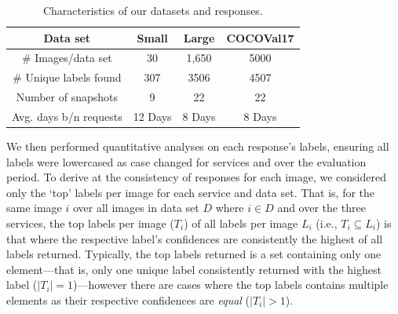 \begin{table}[t]
\caption[Characteristics of data in CV evolution assessment]{Characteristics of our datasets and responses.}
\label{icsme2019:tab:dataset}
\centering
\begin{tabular}{c||c|c|c}
  \toprule
  \textbf{Data set} & \textbf{Small} & \textbf{Large} & \textbf{COCOVal17} \\
  \midrule
  \# Images/data set & 30 & 1,650 & 5000 \\
  \# Unique labels found & 307 & 3506 & 4507\\
  Number of snapshots & 9 & 22 & 22 \\
  Avg. days b/n requests & 12 Days & 8 Days & 8 Days \\
  \bottomrule
\end{tabular}
\end{table}


We then performed quantitative analyses on each response's labels, ensuring all labels were lowercased as case changed for services \googleapi{} and \awsapi{} over the evaluation period. To derive at the consistency of responses for each image, we considered only the `top' labels per image for each service and data set. That is, for the same image $i$ over all images in data set $D$ where $i \in D$ and over the three services, the top labels per image ($T_{i}$) of all labels per image $L_{i}$ (i.e., $T_{i} \subseteq L_{i}$) is that where the respective label's confidences are consistently the highest of all labels returned. 
Typically, the top labels returned is a set containing only one element---that is, only one unique label consistently returned with the highest label ($| T_{i} | = 1$)---however there are cases where the top labels contains multiple elements as their respective confidences are \textit{equal} ($| T_{i} | > 1$).

